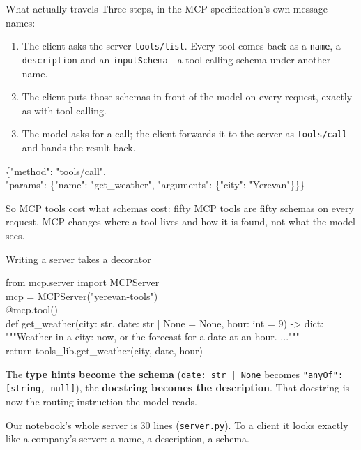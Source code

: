 \documentclass[aspectratio=169]{beamer}
\newcommand{\keybox}[1]{%
  \begin{tcolorbox}[colback=armblue!8, colframe=armblue, boxrule=0.6pt, arc=2pt]
  #1
  \end{tcolorbox}}
\newcommand{\takebox}[1]{%
  \begin{tcolorbox}[colback=paramgreen!8, colframe=paramgreen, boxrule=0.6pt, arc=2pt]
  #1
  \end{tcolorbox}}
\newcommand{\codebox}[1]{%
  \begin{center}
  \begin{tcolorbox}[colback=lightbg, colframe=gray, boxrule=0.5pt, arc=2pt,
                    width=0.94\textwidth, left=4pt, right=4pt, top=3pt, bottom=3pt]
    \ttfamily\scriptsize #1
  \end{tcolorbox}
  \end{center}}
\begin{document}
\begin{frame}{What actually travels}
  \vspace{0.2em}
  {\small Three steps, in the MCP specification's own message names:}

  \vspace{0.2em}
  \begin{enumerate}
    \item[\textbf{1.}] {\small The client asks the server \texttt{tools/list}. Every tool comes back as a
      \texttt{name}, a \texttt{description} and an \texttt{inputSchema} - a tool-calling schema under another
      name.}
    \item[\textbf{2.}] {\small The client puts those schemas in front of the model on every request, exactly
      as with tool calling.}
    \item[\textbf{3.}] {\small The model asks for a call; the client forwards it to the server as
      \texttt{tools/call} and hands the result back.}
  \end{enumerate}

  \codebox{\{"method": "tools/call",\\
  \hspace*{1em}"params": \{"name": "get\_weather", "arguments": \{"city": "Yerevan"\}\}\}}

  \keybox{\small So MCP tools cost what schemas cost: fifty MCP tools are fifty schemas on every request. MCP
  changes where a tool lives and how it is found, not what the model sees.}
\end{frame}

\begin{frame}{Writing a server takes a decorator}
  \vspace{0.3em}
  \codebox{from mcp.server import MCPServer\\[0.2em]
  mcp = MCPServer("yerevan-tools")\\[0.3em]
  @mcp.tool()\\
  def get\_weather(city: str, date: str | None = None, hour: int = 9) -> dict:\\
  \hspace*{1em}"""Weather in a city: now, or the forecast for a date at an hour. ..."""\\
  \hspace*{1em}return tools\_lib.get\_weather(city, date, hour)}

  \vspace{0.2em}
  {\small The \textbf{type hints become the schema} (\texttt{date: str | None} becomes
  \texttt{"anyOf": [string, null]}), the \textbf{docstring becomes the description}. That docstring is now the
  routing instruction the model reads.}

  \vspace{0.4em}
  \takebox{\small Our notebook's whole server is 30 lines (\texttt{server.py}). To a client it looks exactly like
  a company's server: a name, a description, a schema.}
\end{frame}
\end{document}
